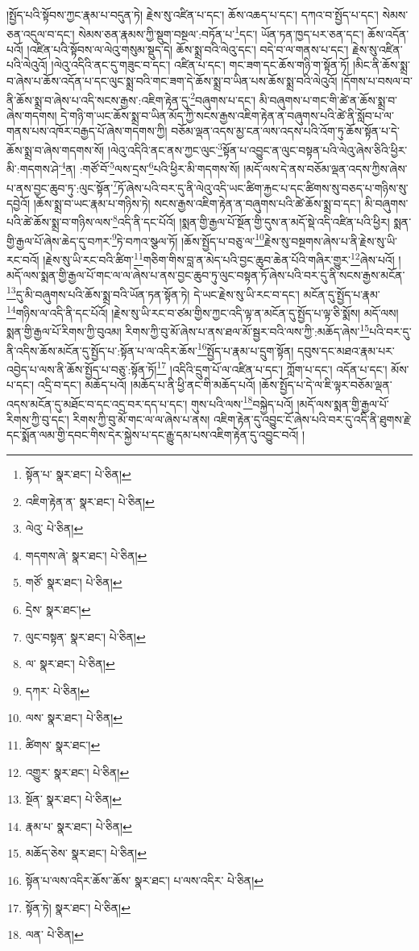 །སྤྱོད་པའི་སྟོབས་ཀྱང་རྣམ་པ་བདུན་ཏེ། རྗེས་སུ་འཛིན་པ་དང་། ཆོས་འཆད་པ་དང་། དཀའ་བ་སྤྱོད་པ་དང་། སེམས་ཅན་འདུལ་བ་དང་། སེམས་ཅན་རྣམས་ཀྱི་སྡུག་བསྔལ་:བཏོན་པ་\footnote{སྟོན་པ་  སྣར་ཐང་།  པེ་ཅིན། }དང་། ཡོན་ཏན་ཁྱད་པར་ཅན་དང་། ཆོས་འདོན་པའོ། །འཛིན་པའི་སྟོབས་ལ་ལེའུ་གསུམ་སྡུད་དེ། ཆོས་སྨྲ་བའི་ལེའུ་དང་། བདེ་བ་ལ་གནས་པ་དང་། རྗེས་སུ་འཛིན་པའི་ལེའུའོ། །ལེའུ་འདིའི་ནང་དུ་གཟུང་བ་དང་། འཛིན་པ་དང་། གང་ཟག་དང་ཆོས་གཉི་ག་སྟོན་ཏོ། །མིང་ནི་ཆོས་སྨྲ་བ་ཞེས་པ་ཆོས་འདོན་པ་དང་ལུང་སྨྲ་བའི་གང་ཟག་དེ་ཆོས་སྨྲ་བ་ཡིན་པས་ཆོས་སྨྲ་བའི་ལེའུའོ། །དོགས་པ་བསལ་བ་ནི་ཆོས་སྨྲ་བ་ཞེས་པ་འདི་སངས་རྒྱས་:འཇིག་རྟེན་དུ་\footnote{འཇིག་རྟེན་ན་  སྣར་ཐང་།  པེ་ཅིན། }བཞུགས་པ་དང་། མི་བཞུགས་པ་གང་གི་ཚེ་ན་ཆོས་སྨྲ་བ་ཞེས་གདགས། དེ་གཉི་ག་ཡང་ཆོས་སྨྲ་བ་ཡིན་མོད་ཀྱི་སངས་རྒྱས་འཇིག་རྟེན་ན་བཞུགས་པའི་ཚེ་ནི་སློབ་པ་ལ་གནས་པས་འཁོར་བརྒྱད་པོ་ཞེས་གདགས་ཀྱི། བཅོམ་ལྡན་འདས་མྱ་ངན་ལས་འདས་པའི་འོག་ཏུ་ཆོས་སྟོན་པ་དེ་ཆོས་སྨྲ་བ་ཞེས་གདགས་སོ། །ལེའུ་འདིའི་ནང་ནས་ཀྱང་ལུང་\footnote{ལེའུ་  པེ་ཅིན། }སྟོན་པ་འབྱུང་ན་ལུང་བསྟན་པའི་ལེའུ་ཞེས་ཅིའི་ཕྱིར་མི་:གདགས་ཤེ་\footnote{གདགས་ཞེ་  སྣར་ཐང་།  པེ་ཅིན། }ན། :གཙོ་བོ་\footnote{གཙོ་  སྣར་ཐང་།  པེ་ཅིན། }ལས་དྲས་\footnote{དྲེས་  སྣར་ཐང་། }པའི་ཕྱིར་མི་གདགས་སོ། །མདོ་ལས་དེ་ནས་བཅོམ་ལྡན་འདས་ཀྱིས་ཞེས་པ་ནས་བྱང་ཆུབ་ཏུ་:ལུང་སྟོན་\footnote{ལུང་བསྟན་  སྣར་ཐང་།  པེ་ཅིན། }ཏོ་ཞེས་པའི་བར་དུ་ནི་ལེའུ་འདི་ཡང་ཚིག་རྐྱང་པ་དང་ཚིགས་སུ་བཅད་པ་གཉིས་སུ་དབྱེའོ། །ཆོས་སྨྲ་བ་ཡང་རྣམ་པ་གཉིས་ཏེ། སངས་རྒྱས་འཇིག་རྟེན་ན་བཞུགས་པའི་ཚེ་ཆོས་སྨྲ་བ་དང་། མི་བཞུགས་པའི་ཚེ་ཆོས་སྨྲ་བ་གཉིས་ལས་\footnote{ལ་  སྣར་ཐང་།  པེ་ཅིན། }འདི་ནི་དང་པོའོ། །སྨན་གྱི་རྒྱལ་པོ་སྔོན་གྱི་དུས་ན་མདོ་སྡེ་འདི་འཛིན་པའི་ཕྱིར། སྨན་གྱི་རྒྱལ་པོ་ཞེས་ཆེད་དུ་བཀར་\footnote{དཀར་  པེ་ཅིན། }ཏེ་བཀའ་སྩལ་ཏོ། །ཆོས་སྤྱོད་པ་བཅུ་ལ་\footnote{ལས་  སྣར་ཐང་།  པེ་ཅིན། }རྗེས་སུ་བསྔགས་ཞེས་པ་ནི་རྗེས་སུ་ཡི་རང་བའོ། །རྗེས་སུ་ཡི་རང་བའི་ཚིག་\footnote{ཚིགས་  སྣར་ཐང་། }གཅིག་གིས་བླ་ན་མེད་པའི་བྱང་ཆུབ་ཆེན་པོའི་གཞིར་གྱུར་\footnote{འགྱུར་  སྣར་ཐང་།  པེ་ཅིན། }ཞེས་པའོ། །མདོ་ལས་སྨན་གྱི་རྒྱལ་པོ་གང་ལ་ལ་ཞེས་པ་ནས་བྱང་ཆུབ་ཏུ་ལུང་བསྟན་ཏོ་ཞེས་པའི་བར་དུ་ནི་སངས་རྒྱས་མངོན་\footnote{སྔོན་  སྣར་ཐང་།  པེ་ཅིན། }དུ་མི་བཞུགས་པའི་ཆོས་སྨྲ་བའི་ཡོན་ཏན་སྟོན་ཏེ། དེ་ཡང་རྗེས་སུ་ཡི་རང་བ་དང་། མངོན་དུ་སྤྱོད་པ་རྣམ་\footnote{རྣམ་པ་  སྣར་ཐང་།  པེ་ཅིན། }གཉིས་ལ་འདི་ནི་དང་པོའོ། །རྗེས་སུ་ཡི་རང་བ་ཙམ་གྱིས་ཀྱང་འདི་ལྟ་ན་མངོན་དུ་སྤྱོད་པ་ལྟ་ཅི་སྨོས། མདོ་ལས། སྨན་གྱི་རྒྱལ་པོ་རིགས་ཀྱི་བུའམ། རིགས་ཀྱི་བུ་མོ་ཞེས་པ་ནས་ཐལ་མོ་སྦྱར་བའི་ལས་ཀྱི་:མཆོད་ཞེས་\footnote{མཆོད་ཅེས་  སྣར་ཐང་།  པེ་ཅིན། }པའི་བར་དུ་ནི་འདིས་ཆོས་མངོན་དུ་སྤྱོད་པ་:སྟོན་པ་ལ་འདིར་ཆོས་\footnote{སྟོན་པ་ལས་འདིར་ཆོས་་ཆོས་  སྣར་ཐང་། པ་ལས་འདིར་  པེ་ཅིན། }སྤྱོད་པ་རྣམ་པ་དྲུག་སྟོན། དབུས་དང་མཐའ་རྣམ་པར་འབྱེད་པ་ལས་ནི་ཆོས་སྤྱོད་པ་བཅུ་:སྟོན་ཏོ།\footnote{སྟོན་ཏེ།  སྣར་ཐང་།  པེ་ཅིན། } །འདིའི་དྲུག་པོ་ལ་འཛིན་པ་དང་། ཀློག་པ་དང་། འདོན་པ་དང་། མོས་པ་དང་། འདྲི་བ་དང་། མཆོད་པའོ། །མཆོད་པ་ནི་ཕྱི་ནང་གི་མཆོད་པའོ། །ཆོས་སྤྱོད་པ་དེ་ལ་ཇི་ལྟར་བཅོམ་ལྡན་འདས་མངོན་དུ་མཐོང་བ་དང་འདྲ་བར་དད་པ་དང་། གུས་པའི་ལས་\footnote{ལན་  པེ་ཅིན། }བསྐྱེད་པའོ། །མདོ་ལས་སྨན་གྱི་རྒྱལ་པོ་རིགས་ཀྱི་བུ་དང་། རིགས་ཀྱི་བུ་མོ་གང་ལ་ལ་ཞེས་པ་ནས། འཇིག་རྟེན་དུ་འབྱུང་ངོ་ཞེས་པའི་བར་དུ་འདི་ནི་ཐུགས་རྗེ་དང་སྨོན་ལམ་གྱི་དབང་གིས་དེར་སྐྱེས་པ་དང་རྒྱུ་དམ་པས་འཇིག་རྟེན་དུ་འབྱུང་བའོ། །
